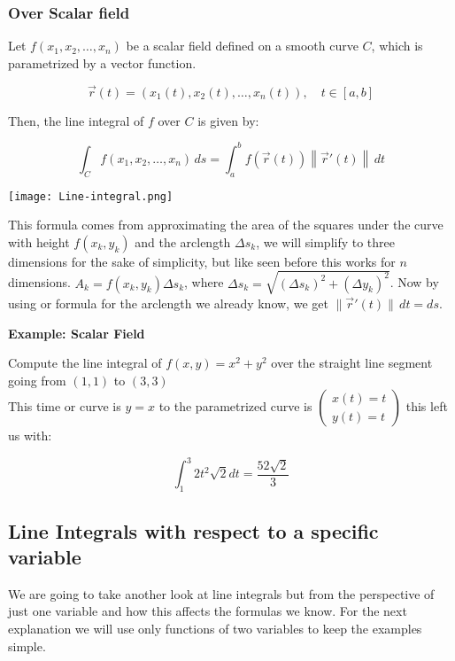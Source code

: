 \subsubsection{Over Scalar field}

Let \( f(x_1, x_2, \ldots, x_n) \) be a scalar field defined on a smooth curve \( C \), which 
is parametrized by a vector function.

\[
\vec{r}(t) = (x_1(t), x_2(t), \ldots, x_n(t)), \quad t \in [a, b]
\]

Then, the line integral of \( f \) over \( C \) is given by:

\[
\int_C f(x_1, x_2, \ldots, x_n) \, ds = \int_a^b f(\vec{r}(t)) \left\| \vec{r}'(t) \right\| \, dt
\]


\begin{center}
    \texttt{[image: Line-integral.png]}
\end{center}

This formula comes from approximating the area of the squares under the curve with height \(f(x_k, y_k)\) 
and the arclength \(\varDelta s_k\), we will simplify to three dimensions for the sake
of simplicity, but like seen before this works for \(n\) dimensions. 
\(A_k = f(x_k, y_k) \varDelta s_k\), where 
\(\varDelta s_k = \sqrt{(\varDelta s_k)^2 + (\varDelta y_k)^2} \). Now by using or formula for the arclength
we already know, we get \(\|\vec{r}' (t)\| \, dt = ds\). 

\textbf{Example: Scalar Field}
\vspace{\baselineskip}

Compute the line integral of \(f(x,y) = x^2 + y^2\) over the straight line segment going
from \((1,1)\) to \((3,3)\)
\\
This time or curve is \(y = x\) to the parametrized curve is \(\begin{pmatrix}
    x(t) = t \\ y(t) = t
\end{pmatrix}\) this left us with:

\[
\int_{1}^{3}  2t^2 \sqrt{2}dt = \frac{52\sqrt{2}}{3} 
\]

\subsection{Line Integrals with respect to a specific variable}

We are going to take another look at line integrals but from the perspective of just one variable and how 
this affects the formulas we know. For the next explanation we will use only functions of two variables to keep the 
examples simple.

